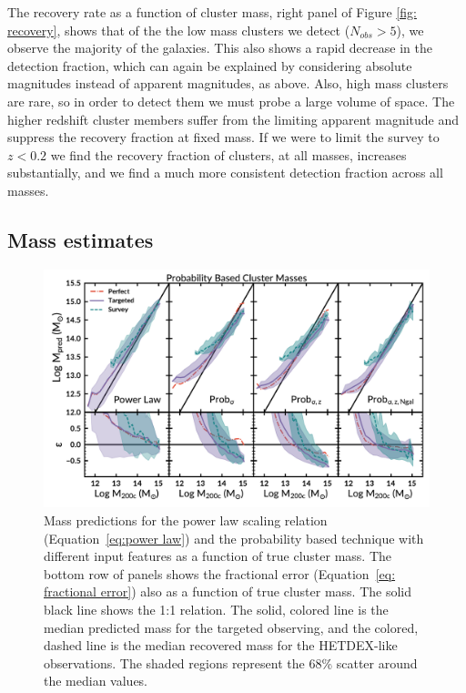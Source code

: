 \documentclass[fleqn,usenatbib]{mnras}
\begin{document}
The recovery rate as a function of cluster mass, right panel of Figure \ref{fig: recovery}, shows that of the the low mass clusters we detect ($N_{obs} >5$), we observe the majority of the galaxies. This also shows a rapid decrease in the detection fraction, which can again be explained by considering absolute magnitudes instead of apparent magnitudes, as above. Also, high mass clusters are rare, so in order to detect them we must probe a large volume of space. The higher redshift cluster members suffer from the limiting apparent magnitude and suppress the recovery fraction at fixed mass. If we were to limit the survey to $z<0.2$ we find the recovery fraction of clusters, at all masses, increases substantially, and we find a much more consistent detection fraction across all masses.

\subsection{Mass estimates}
\begin{figure} 
	\includegraphics[width=\textwidth]{figures/Probcomparison.pdf} 
	\caption{Mass predictions for the power law scaling relation (Equation~\ref{eq:power law}) and the probability based technique with different input features as a function of true cluster mass. The bottom row of panels shows the fractional error (Equation~\ref{eq: fractional error}) also as a function of true cluster mass. The solid black line shows the 1:1 relation. The solid, colored line is the median predicted mass for the targeted observing, and the colored, dashed line is the median recovered mass for the HETDEX-like observations. The shaded regions represent the 68\% scatter around the median values.} \label{fig:Probability comparison} 
\end{figure}
\end{document}

